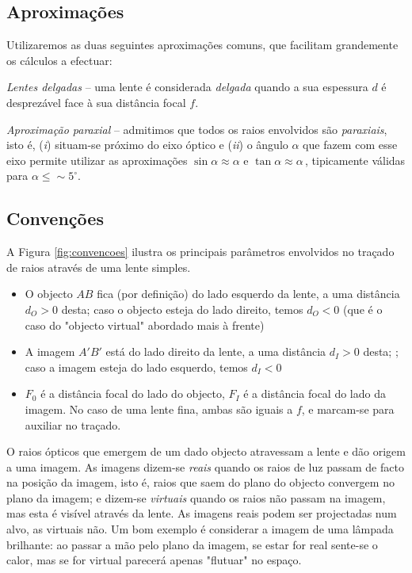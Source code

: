 \documentclass[a4paper,12pt]{article}      %
\begin{document}
\subsection{\sf Aproximações}
Utilizaremos as duas seguintes aproximações comuns, que facilitam grandemente os cálculos a efectuar:

\emph{Lentes delgadas} -- uma lente é considerada \emph{delgada} quando a sua espessura $d$ é desprezável face à sua distância focal $f$.

\emph{Aproximação paraxial} -- admitimos que todos os raios envolvidos são \emph{paraxiais}, isto é, (\emph{i}) situam-se próximo do eixo óptico e (\emph{ii}) o ângulo $\alpha$ que fazem com esse eixo permite utilizar as aproximações $\sin \alpha \approx \alpha$ e  $\tan \alpha \approx \alpha\,$, tipicamente válidas para $\alpha \leq \sim5^{\circ}$.


\subsection{\sf Convenções}
A Figura \ref{fig:convencoes} ilustra os principais parâmetros envolvidos no traçado de raios através de uma lente simples.

\begin{itemize}
\item O objecto $AB$ fica (por definição) do lado esquerdo da lente, a uma distância $d_O>0$ desta; caso o objecto esteja do lado direito, temos $d_O<0$ (que é o caso do "objecto virtual" abordado mais à frente)
\item A imagem $A'B'$ está do lado direito da lente, a uma distância $d_I>0$ desta; ; caso a imagem esteja do lado esquerdo, temos $d_I<0$
\item $F_0$ é a distância focal do lado do objecto, $F_I$ é a distância focal do lado da imagem. No caso de uma lente fina, ambas são iguais a $f$, e marcam-se para auxiliar no traçado.
\end{itemize}


O raios ópticos que emergem de um dado objecto atravessam a lente e dão origem a uma imagem. As imagens dizem-se \emph{reais} quando os raios de luz passam de facto na posição da imagem, isto é, raios que saem do plano do objecto convergem no plano da imagem; e dizem-se \emph{virtuais} quando os raios não passam na imagem, mas esta é visível através da lente. As imagens reais podem ser projectadas num alvo, as virtuais não. Um bom exemplo é considerar a imagem de uma lâmpada brilhante: ao passar a mão pelo plano da imagem, se estar for real sente-se o calor, mas se for virtual parecerá apenas "flutuar" no espaço.
\end{document}
